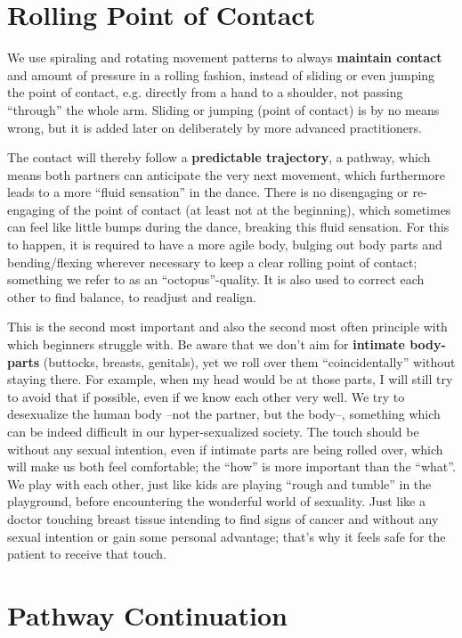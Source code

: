 \section{Rolling Point of Contact}\label{sec:rolling-point-of-contact}

We use spiraling and rotating movement patterns to always \textbf{maintain contact} and amount of pressure in a rolling fashion, instead of sliding or even jumping the point of contact, e.g. directly from a hand to a shoulder, not passing ``through'' the whole arm.
Sliding or jumping (point of contact) is by no means wrong, but it is added later on deliberately by more advanced practitioners.

The contact will thereby follow a \textbf{predictable trajectory}, a pathway, which means both partners can anticipate the very next movement, which furthermore leads to a more ``fluid sensation'' in the dance.
There is no disengaging or re-engaging of the point of contact (at least not at the beginning), which sometimes can feel like little bumps during the dance, breaking this fluid sensation.
For this to happen, it is required to have a more agile body, bulging out body parts and bending/flexing wherever necessary to keep a clear rolling point of contact; something we refer to as an ``octopus''-quality.
It is also used to correct each other to find balance, to readjust and realign.

This is the second most important and also the second most often principle with which beginners struggle with.
Be aware that we don't aim for \textbf{intimate body-parts} (buttocks, breasts, genitals), yet we roll over them ``coincidentally'' without staying there.
For example, when my head would be at those parts, I will still try to avoid that if possible, even if we know each other very well.
We try to desexualize the human body --not the partner, but the body--, something which can be indeed difficult in our hyper-sexualized society.
The touch should be without any sexual intention, even if intimate parts are being rolled over, which will make us both feel comfortable; the ``how'' is more important than the ``what''.
We play with each other, just like kids are playing ``rough and tumble'' in the playground, before encountering the wonderful world of sexuality.
Just like a doctor touching breast tissue intending to find signs of cancer and without any sexual intention or gain some personal advantage; that's why it feels safe for the patient to receive that touch.

\section{Pathway Continuation}\label{sec:pathway-continuation}

